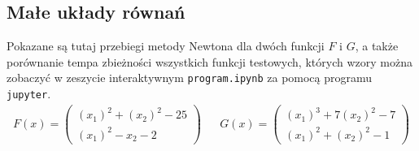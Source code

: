 \documentclass[11pt,wide]{mwart}
\begin{document}
\subsection{Małe układy równań}
Pokazane są tutaj przebiegi metody Newtona dla dwóch funkcji $ F $ i $ G $, a także porównanie tempa zbieżności wszystkich funkcji testowych, których wzory można zobaczyć w zeszycie interaktywnym \texttt{program.ipynb} za pomocą programu \texttt{jupyter}.
\begin{align*}
F(x) = 
\left(\begin{matrix}
	(x_1)^2 + (x_2)^2 - 25 \\
	(x_1)^2 - x_2 - 2
\end{matrix}\right) && G(x) =
\left(\begin{matrix}
(x_1)^3 + 7(x_2)^2 - 7 \\
(x_1)^2 + (x_2)^2 - 1
\end{matrix}\right)
\end{align*}
\end{document}
